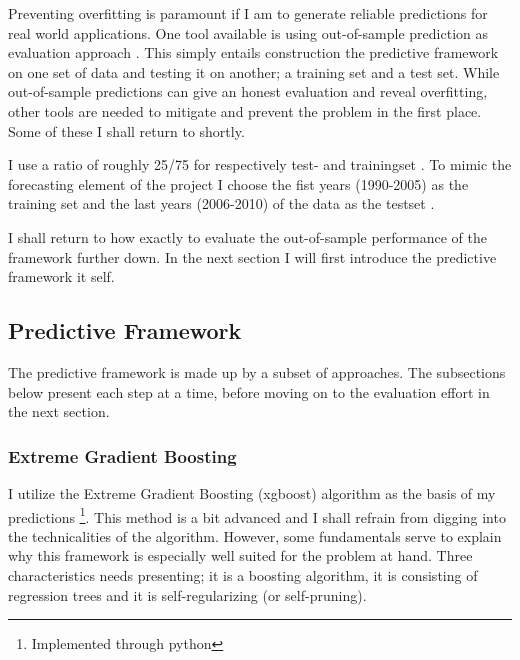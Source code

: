 \documentclass[a4paper]{article}
\begin{document}
Preventing overfitting is paramount if I am to generate reliable predictions for real world applications. One tool available is using out-of-sample prediction as evaluation approach \citep{king_zeng_2001b, Ward_Greenhill_Bakke_2010, perry_2013, Schrodt_2014}. This simply entails construction the predictive framework on one set of data and testing it on another; a training set and a test set. While out-of-sample predictions can give an honest evaluation and reveal overfitting, other tools are needed to mitigate and prevent the problem in the first place. Some of these I shall return to shortly.\par

I use a ratio of roughly 25/75 for respectively test- and trainingset \citep{Friedman_2001, Ward_Greenhill_Bakke_2010}. To mimic the forecasting element of the project I choose the fist years (1990-2005) as the training set and the last years (2006-2010) of the data as the testset \citep{Goldstone_2010}.\par

I shall return to how exactly to evaluate the out-of-sample performance of the framework further down. In the next section I will first introduce the predictive framework it self.\par

\subsection{Predictive Framework}

The predictive framework is made up by a subset of approaches. The subsections below present each step at a time, before moving on to the evaluation effort in the next section.\par

\subsubsection{Extreme Gradient Boosting}

I utilize the Extreme Gradient Boosting (xgboost) algorithm as the basis of my predictions \citep{Chen_2016}\footnote{Implemented through python}. This method is a bit advanced and I shall refrain from digging into the technicalities of the algorithm. However, some fundamentals serve to explain why this framework is especially well suited for the problem at hand. Three characteristics needs presenting; it is a boosting algorithm, it is consisting of regression trees and it is self-regularizing (or self-pruning).
\end{document}
